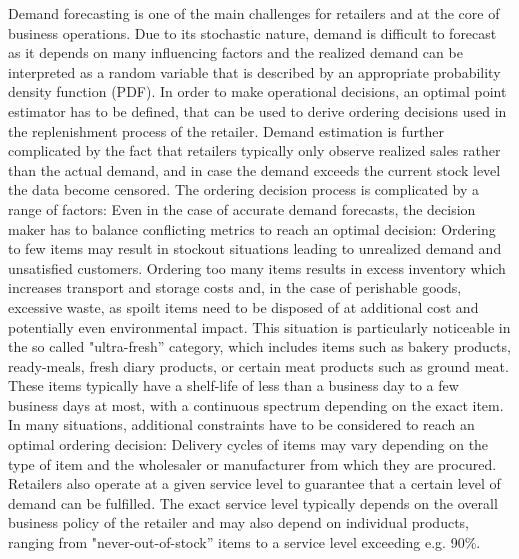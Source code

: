 \documentclass[BCOR=1mm, DIV=calc,10pt,
twoside=true,
twocolumn,
headings=normal]{scrartcl}
\begin{document}
Demand forecasting is one of the main challenges for retailers and at the core of business operations. Due to its stochastic nature, demand is difficult to forecast as it depends on many influencing factors and the realized demand can be interpreted as a random variable that is described by an appropriate probability density function (PDF). In order to make operational decisions, an optimal point estimator has to be defined, that can be used to derive ordering decisions used in the replenishment process of the retailer. Demand estimation is further complicated by the fact that retailers typically only observe realized sales rather than the actual demand, and in case the demand exceeds the current stock level the data become censored. The ordering decision process is complicated by a range of factors: Even in the case of accurate  demand forecasts, the decision maker has to balance conflicting metrics to reach an optimal decision: Ordering to few items may result in stockout situations leading to unrealized demand and unsatisfied customers. Ordering too many items results in excess inventory which increases transport and storage costs and, in the case of perishable goods, excessive waste, as spoilt items need to be disposed of at additional cost and potentially even environmental impact. This situation is particularly noticeable in the so called "ultra-fresh'' category, which includes items such as bakery products, ready-meals, fresh diary products, or certain meat products such as ground meat. These items typically have a shelf-life of less than a business day to a few business days at most, with a continuous spectrum depending on the exact item. In many situations, additional constraints have to be considered to reach an optimal ordering decision: Delivery cycles of items may vary depending on the type of item and the wholesaler or manufacturer from which they are procured. Retailers also operate at a given service level to guarantee that a certain level of demand can be fulfilled. The exact service level typically depends on the overall business policy of the retailer and may also depend on individual products, ranging from "never-out-of-stock'' items to a service level exceeding e.g. 90\%.
\end{document}
